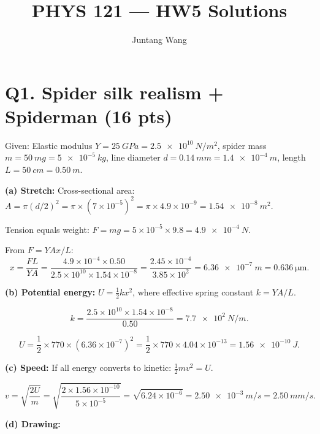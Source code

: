 \documentclass[11pt]{article}
\title{PHYS 121 --- HW5 Solutions}
\author{Juntang Wang}
\newcommand{\ans}[1]{\boxed{\displaystyle #1}}
\begin{document}
\maketitle
{}

\def\g{\,\mathrm{g}}

\section*{Q1. Spider silk realism + Spiderman (16 pts)}
Given: Elastic modulus $Y = \SI{25}{GPa} = \SI{2.5e10}{N/m^2}$, spider mass $m = \SI{50}{mg} = \SI{5e-5}{kg}$, line diameter $d = \SI{0.14}{mm} = \SI{1.4e-4}{m}$, length $L = \SI{50}{cm} = \SI{0.50}{m}$.

\textbf{(a) Stretch:} Cross-sectional area: $A = \pi(d/2)^2 = \pi \times (7 \times 10^{-5})^2 = \pi \times 4.9 \times 10^{-9} = \SI{1.54e-8}{m^2}$.

Tension equals weight: $F = mg = 5 \times 10^{-5} \times 9.8 = \SI{4.9e-4}{N}$.

From $F = YA x/L$:
\[ x = \frac{FL}{YA} = \frac{4.9 \times 10^{-4} \times 0.50}{2.5 \times 10^{10} \times 1.54 \times 10^{-8}} = \frac{2.45 \times 10^{-4}}{3.85 \times 10^{2}} = \ans{\SI{6.36e-7}{m} = \SI{0.636}{\micro\meter}}. \]

\textbf{(b) Potential energy:} $U = \frac{1}{2}kx^2$, where effective spring constant $k = YA/L$.

\[ k = \frac{2.5 \times 10^{10} \times 1.54 \times 10^{-8}}{0.50} = \SI{7.7e2}{N/m}. \]

\[ U = \frac{1}{2} \times 770 \times (6.36 \times 10^{-7})^2 = \frac{1}{2} \times 770 \times 4.04 \times 10^{-13} = \ans{\SI{1.56e-10}{J}}. \]

\textbf{(c) Speed:} If all energy converts to kinetic: $\frac{1}{2}mv^2 = U$.

\[ v = \sqrt{\frac{2U}{m}} = \sqrt{\frac{2 \times 1.56 \times 10^{-10}}{5 \times 10^{-5}}} = \sqrt{6.24 \times 10^{-6}} = \ans{\SI{2.50e-3}{m/s} = \SI{2.50}{mm/s}}. \]

\textbf{(d) Drawing:}
\begin{center}
\end{center}
\end{document}

